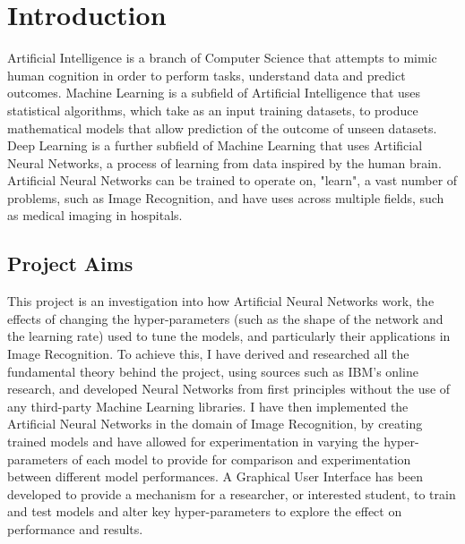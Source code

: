 \documentclass[./project-report/src/latex/project-report.tex]{subfiles}
\begin{document}
\maketitle

\clearpage
\section{Introduction}

Artificial Intelligence is a branch of Computer Science that attempts to mimic human cognition in order to perform tasks, understand data and predict outcomes. 
Machine Learning is a subfield of Artificial Intelligence that uses statistical algorithms, which take as an input training datasets, to produce mathematical models 
that allow prediction of the outcome of unseen datasets. Deep Learning is a further subfield of Machine Learning that uses Artificial Neural Networks, a process of 
learning from data inspired by the human brain. Artificial Neural Networks can be trained to operate on, "learn", a vast number of problems, such as Image Recognition, 
and have uses across multiple fields, such as medical imaging in hospitals.

\subsection{Project Aims}

This project is an investigation into how Artificial Neural Networks work, the effects of changing the hyper-parameters (such as the shape of the network and the 
learning rate) used to tune the models, and particularly their applications in Image Recognition. To achieve this, I have derived and researched all the fundamental 
theory behind the project, using sources such as IBM's online research, and developed Neural Networks from first principles without the use of any third-party Machine 
Learning libraries. I have then implemented the Artificial Neural Networks in the domain of Image Recognition, by creating trained models and have allowed for experimentation 
in varying the hyper-parameters of each model to provide for comparison and experimentation between different model performances. A Graphical User Interface has been developed 
to provide a mechanism for a researcher, or interested student, to train and test models and alter key hyper-parameters to explore the effect on performance and results.

\pagebreak
\end{document}
